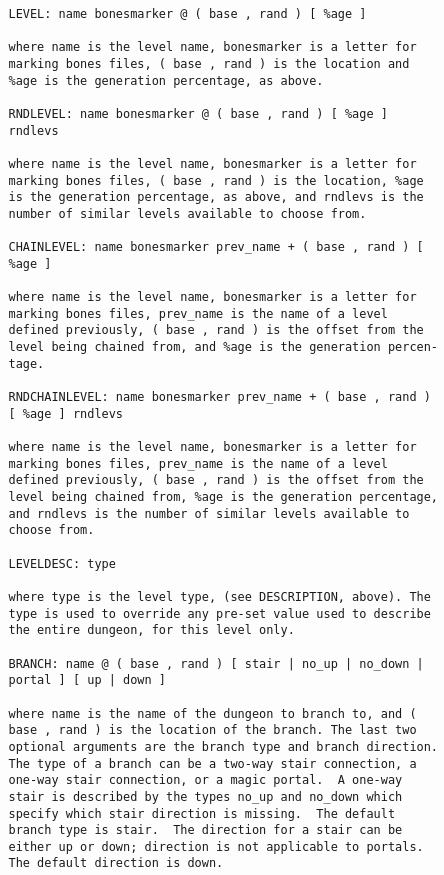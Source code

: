 \documentclass[11pt]{article}
\begin{document}
\begin{verbatim}
   LEVEL: name bonesmarker @ ( base , rand ) [ %age ]

   where name is the level name, bonesmarker is a letter for
   marking bones files, ( base , rand ) is the location and
   %age is the generation percentage, as above.

   RNDLEVEL: name bonesmarker @ ( base , rand ) [ %age ]
   rndlevs

   where name is the level name, bonesmarker is a letter for
   marking bones files, ( base , rand ) is the location, %age
   is the generation percentage, as above, and rndlevs is the
   number of similar levels available to choose from.

   CHAINLEVEL: name bonesmarker prev_name + ( base , rand ) [
   %age ]

   where name is the level name, bonesmarker is a letter for
   marking bones files, prev_name is the name of a level
   defined previously, ( base , rand ) is the offset from the
   level being chained from, and %age is the generation percen-
   tage.

   RNDCHAINLEVEL: name bonesmarker prev_name + ( base , rand )
   [ %age ] rndlevs

   where name is the level name, bonesmarker is a letter for
   marking bones files, prev_name is the name of a level
   defined previously, ( base , rand ) is the offset from the
   level being chained from, %age is the generation percentage,
   and rndlevs is the number of similar levels available to
   choose from.

   LEVELDESC: type

   where type is the level type, (see DESCRIPTION, above). The
   type is used to override any pre-set value used to describe
   the entire dungeon, for this level only.

   BRANCH: name @ ( base , rand ) [ stair | no_up | no_down |
   portal ] [ up | down ]

   where name is the name of the dungeon to branch to, and (
   base , rand ) is the location of the branch. The last two
   optional arguments are the branch type and branch direction.
   The type of a branch can be a two-way stair connection, a
   one-way stair connection, or a magic portal.  A one-way
   stair is described by the types no_up and no_down which
   specify which stair direction is missing.  The default
   branch type is stair.  The direction for a stair can be
   either up or down; direction is not applicable to portals.
   The default direction is down.


\end{verbatim}
\end{document}
